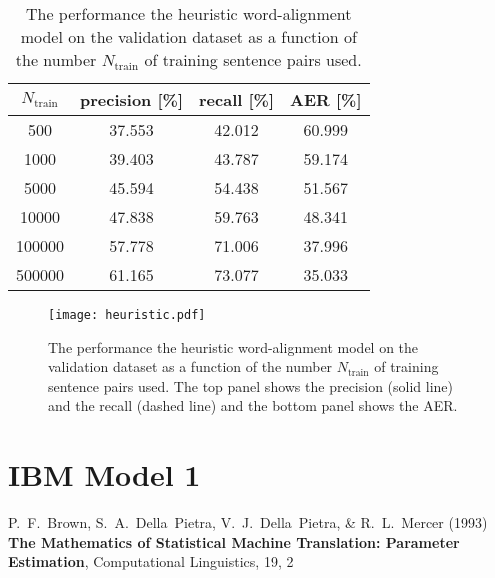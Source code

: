\documentclass[11pt]{article}
\newcommand{\figlabel}[1]{\label{fig:#1}}
\newcommand{\etal}{\emph{et al.}}
\begin{document}
\begin{table}[htbp]
\begin{center}
\begin{tabular}{c ccc}
\toprule
$N_\mathrm{train}$ & precision [\%] & recall [\%] & AER [\%] \\\midrule
500 & 37.553 & 42.012 & 60.999 \\
1000 & 39.403 & 43.787 & 59.174 \\
5000 & 45.594 & 54.438 & 51.567 \\
10000 & 47.838 & 59.763 & 48.341 \\
100000 & 57.778 & 71.006 & 37.996 \\
500000 & 61.165 & 73.077 & 35.033 \\
\bottomrule
\end{tabular}
\end{center}
\caption{%
The performance the heuristic word-alignment model on the validation dataset
as a function of the number $N_\mathrm{train}$ of training sentence pairs used.
\label{tab:heuristic}}
\end{table}

\begin{figure}[htbp]
\begin{center}
    \texttt{[image: heuristic.pdf]}
\end{center}
\caption{%
The performance the heuristic word-alignment model on the validation dataset
as a function of the number $N_\mathrm{train}$ of training sentence pairs used.
The top panel shows the precision (solid line) and the recall (dashed line)
and the bottom panel shows the AER.
\figlabel{heuristic}}
\end{figure}

\section{IBM Model 1}

\begin{thebibliography}{}\raggedright

\bibitem[Brown \etal(1993)]{ibm}
P.~F.~Brown, S.~A.~Della\ Pietra, V.~J.~Della\ Pietra, \& R.~L.~Mercer (1993)
\textbf{The Mathematics of Statistical Machine Translation: Parameter
        Estimation}, Computational Linguistics, 19, 2

\end{thebibliography}
\end{document}
